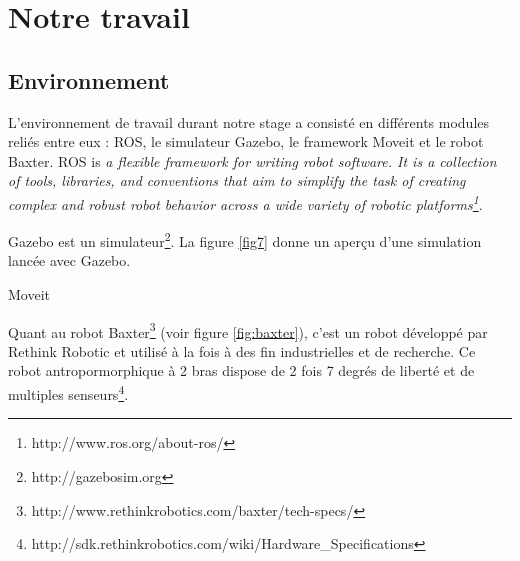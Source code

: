 \documentclass{llncs}
\begin{document}


\section{Notre travail}


\subsection{Environnement}

L'environnement de travail durant notre stage a consisté en différents modules reliés entre eux : ROS,  le simulateur  Gazebo, le framework Moveit et le robot Baxter. ROS is \textit{a flexible framework for writing robot software. It is a collection of tools, libraries, and conventions that aim to simplify the task of creating complex and robust robot behavior across a wide variety of robotic platforms\footnote{http://www.ros.org/about-ros/}}.

Gazebo est un simulateur\footnote{http://gazebosim.org}. La figure \ref{fig7} donne un aperçu d'une simulation lancée avec Gazebo.

Moveit

Quant au robot Baxter\footnote{http://www.rethinkrobotics.com/baxter/tech-specs/} (voir figure \ref{fig:baxter}), c'est un robot développé par Rethink Robotic et utilisé à la fois à des fin industrielles et de recherche. Ce robot antropormorphique à 2 bras dispose de 2 fois 7 degrés de liberté et de multiples senseurs\footnote{http://sdk.rethinkrobotics.com/wiki/Hardware\_Specifications}.
\end{document}
